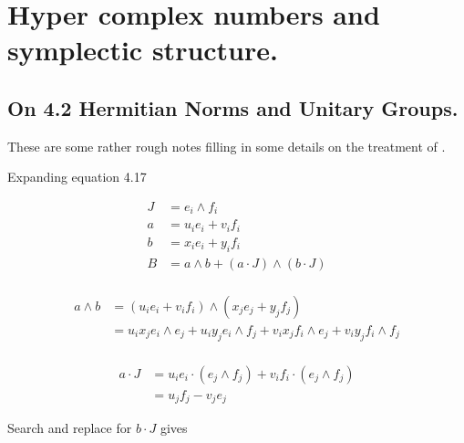 
%
%







\chapter{Hyper complex numbers and symplectic structure. }
\date{ November 8, 2008.  $RCSfile: complex.tex,v $ Last $Revision: 1.8 $ $Date: 2009/06/11 16:45:58 $ }

%

\section{On 4.2 Hermitian Norms and Unitary Groups. }

These are some rather rough notes filling in some details 
on the treatment of \cite{DoranHamiltonian}.

Expanding equation 4.17

\begin{align*}
J &= e_i \wedge f_i \\
a &= u_i e_i + v_i f_i \\
b &= x_i e_i + y_i f_i \\
B &= a \wedge b + (a \cdot J) \wedge (b \cdot J)  \\
\end{align*}

\begin{align*}
a \wedge b
&= (u_i e_i + v_i f_i) \wedge (x_j e_j + y_j f_j) \\
&= 
u_i x_j e_i \wedge e_j 
+ u_i y_j e_i \wedge f_j
+ v_i x_j f_i \wedge e_j
+ v_i y_j f_i \wedge f_j \\
\end{align*}

\begin{align*}
a \cdot J
&=
u_i e_i \cdot ( e_j \wedge f_j )
+ v_i f_i \cdot ( e_j \wedge f_j ) \\
&= u_j f_j - v_j e_j
\end{align*}

Search and replace for $b \cdot J$ gives

